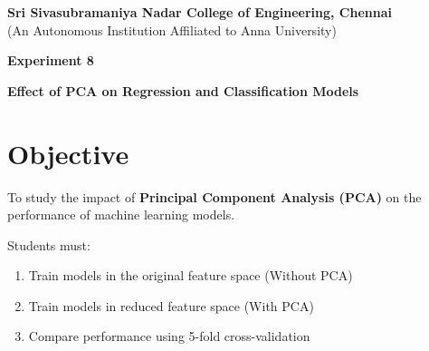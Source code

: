 \documentclass[11pt]{article}
\begin{document}
\begin{center}
    \large \textbf{Sri Sivasubramaniya Nadar College of Engineering, Chennai} \\
    (An Autonomous Institution Affiliated to Anna University) \\
    \vspace{0.3cm}
\end{center}

\begin{table}[!h]
\renewcommand{\arraystretch}{1.5}
\end{table}

\begin{center}
    \textbf{\Large Experiment 8}
\end{center}

\begin{center}
    \textbf{Effect of PCA on Regression and Classification Models}
\end{center}

\section{Objective}
To study the impact of \textbf{Principal Component Analysis (PCA)} 
on the performance of machine learning models.

Students must:

\begin{enumerate}[label=\alph*)]
    \item Train models in the original feature space (Without PCA)
    \item Train models in reduced feature space (With PCA)
    \item Compare performance using 5-fold cross-validation
\end{enumerate}
\end{document}

